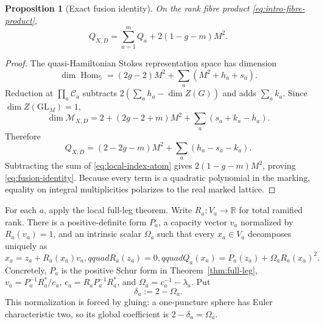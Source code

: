 \documentclass[11pt,a4paper]{amsart}
\theoremstyle{plain}
\newtheorem{proposition}[theorem]{Proposition}
\theoremstyle{definition}
\newcommand{\RR}{\mathbb R}
\newcommand{\Mcal}{\mathcal M}
\begin{document}
\begin{proposition}[Exact fusion identity]\label{prop:fusion-identity}
On the rank fibre product \eqref{eq:intro-fibre-product},
\begin{equation}\label{eq:fusion-identity}
             \boxed{Q_{X,D}=\sum_{a=1}^mQ_a+2(1-g-m)M^2.}
\end{equation}
\end{proposition}

\begin{proof}
The quasi-Hamiltonian Stokes representation space has dimension
\[
 \dim\operatorname{Hom}_{\mathbb S}
 =(2g-2)M^2+\sum_a(M^2+h_a+s_a).
\]
Reduction at $\prod_a\mathcal C_a$ subtracts
$2(\sum_ah_a-\dim Z(G))$ and adds $\sum_ak_a$.  Since
$\dim Z(\mathrm{GL}_M)=1$,
\begin{equation}\label{eq:global-dimension-expanded}
 \dim\Mcal_{X,D}
 =2+(2g-2+m)M^2+\sum_a(s_a+k_a-h_a).
\end{equation}
Therefore
\[
 Q_{X,D}=(2-2g-m)M^2+\sum_a(h_a-s_a-k_a).
\]
Subtracting the sum of \eqref{eq:local-index-atom} gives
$2(1-g-m)M^2$, proving \eqref{eq:fusion-identity}.  Because every term is a quadratic polynomial
in the marking, equality on integral multiplicities polarizes to the real marked lattice.
\end{proof}

For each $a$, apply the local full-leg theorem.  Write $R_a:V_a\to\RR$ for total ramified rank.
There is a positive-definite form $P_a$, a capacity vector $v_a$ normalized by $R_a(v_a)=1$, and
an intrinsic scalar $\Omega_a$ such that every $x_a\in V_a$ decomposes uniquely as
\begin{equation}\label{eq:local-capacity-splitting}
 x_a=z_a+R_a(x_a)v_a,qquad R_a(z_a)=0,qquad
 Q_a(x_a)=P_a(z_a)+\Omega_aR_a(x_a)^2.
\end{equation}
Concretely, $P_a$ is the positive Schur form in Theorem~\ref{thm:full-leg},
$v_a=P_a^{-1}R_a^*/c_a$, $c_a=R_aP_a^{-1}R_a^*$, and
$\Omega_a=c_a^{-1}-\lambda_a$.  Put
\begin{equation}\label{eq:local-capacity-defect}
                         \delta_a:=2-\Omega_a.
\end{equation}
This normalization is forced by gluing: a one-puncture sphere has Euler characteristic two, so its
global coefficient is $2-\delta_a=\Omega_a$.
\end{document}
